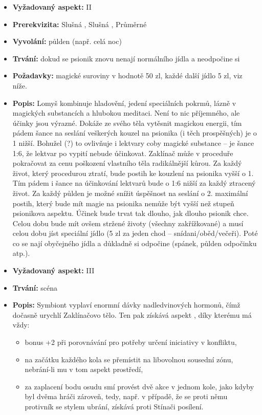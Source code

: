 \documentclass[../main.tex]{subfiles}
\begin{document}
\begin{specialita}
\begin{itemize}
	\item \textbf{Vyžadovaný aspekt:} II
	\item \textbf{Prerekvizita:} Slušná , Slušná , Průměrné 
	\item \textbf{Vyvolání:} půlden (např. celá noc)
	\item \textbf{Trvání:} dokud se psionik znovu nenají normálního jídla a neodpočine si
	\item \textbf{Požadavky:} magické suroviny v hodnotě 50 zl, každé další jídlo 5 zl, viz níže.
	\item \textbf{Popis:} Lomyš kombinuje hladovění, jedení speciálních pokrmů, lázně v magických substancích a hlubokou meditaci. Není to nic příjemného, ale účinky jsou výrazné. Dokáže ze svého těla vytěsnit magickou energii, tím pádem šance na seslání veškerých kouzel na psionika (i těch prospěšných) je o 1 nižší. Bohužel (?) to ovlivňuje i lektvary coby magické substance – je šance 1:6, že lektvar po vypití nebude účinkovat. Zaklínač může v proceduře pokračovat za cenu poškození vlastního těla radikálnější kůrou. Za každý život, který procedurou ztratí, bude postih ke kouzlení na psionika vyšší o 1. Tím pádem i šance na účinkování lektvarů bude o 1:6 nižší za každý ztracený život. Za každý půlden je možné snížit úspěšnost na seslání o 2. maximální postih, který bude mít magie na psionika nemůže být vyšší než stupeň psionikova aspektu. Účinek bude trvat tak dlouho, jak dlouho psionik chce. Celou dobu bude mít ovšem stržené životy (všechny zakřížkované) a musí celou dobu jíst speciální jídlo (5 zl za jeden chod – snídani/oběd/večeři). Poté co se nají obyčejného jídla a důkladně si odpočine (spánek, půlden odpočinku atp.).
\end{itemize}
\end{specialita}

\begin{specialita}
\begin{itemize}
	\item \textbf{Vyžadovaný aspekt:} III
	\item \textbf{Trvání:} scéna
	\item \textbf{Popis:} Symbiont vyplaví enormní dávky nadledvinových hormonů, čímž dočasně urychlí Zaklínačovo tělo. Ten pak získává aspekt , díky kterému má vždy:
		\begin{itemize}
			\item bonus +2 při porovnávání  pro potřeby určení iniciativy v konfliktu,
			\item na začátku každého kola se přemístit na libovolnou sousední zónu, nebrání-li mu v tom aspekt prostředí,
			\item za zaplacení bodu osudu smí provést dvě akce v jednom kole, jako kdyby byl dvěma hráči zároveň, tedy, např. v případě, že se proti němu protivník se stylem ubrání, získává proti Stínači posílení.
		\end{itemize}
\end{itemize}
\end{specialita}
\end{document}
